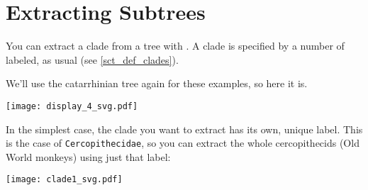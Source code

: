 

\section{Extracting Subtrees}
\label{sct_subtrees}

You can extract a clade from a tree with \clade. A clade is specified by a
number of labeled, as usual (see \ref{sct_def_clades}).

We'll use the catarrhinian tree again for these examples, so here it is.

\begin{center}
\texttt{[image: display\_4\_svg.pdf]}
\end{center}

 In the simplest case, the clade you want to extract has its own, unique label.
This is the case of \texttt{Cercopithecidae}, so you can extract the whole
cercopithecids (Old World monkeys) using just that label:


\begin{center}
  \texttt{[image: clade1\_svg.pdf]}
\end{center}
